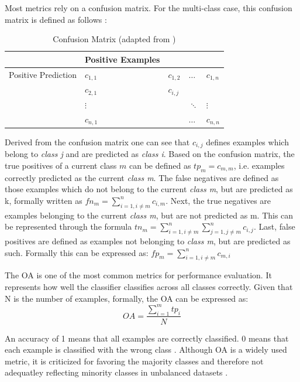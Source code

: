 \documentclass[12pt, a4paper, titlepage]{article}
\begin{document}
Most metrics rely on a confusion matrix. For the multi-class case, this confusion matrix is defined as follows \citep{Kautz2017}: 
\begin{table}[]
  \center
  \begin{tabular}{lllll}
  \hline
            & Positive Examples      &           &             &             \\ \hline
  Positive Prediction  & $c_{1,1}$ & $c_{1,2}$ & $\dots$     & $c_{1,n}$   \\
            & $c_{2,1}$ & $c_{i,j}$ &             &             \\
            &  $\vdots$         &           & $\ddots$ &   $\vdots$\\
            & $c_{n,1}$ &           & $\dots$     & $c_{n,n}$   \\ \hline
  \end{tabular}
  \caption[Confusion Matrix]{\label{tab: T1} Confusion Matrix (adapted from \citep[113]{Kautz2017})}
  \end{table}

Derived from the confusion matrix one can see that $c_{i, j}$ defines examples which belong to  \textit{class j} and are predicted as \textit{class i}. Based on the confusion matrix, the true positives of a current class $m$ can be defined as $tp_{m} = c_{m, m}$, i.e. examples correctly predicted as the current  \textit{class m}. The false negatives are defined as those examples which do not belong to the current \textit{class m}, but are predicted as k, formally written as $fn_{m} = \sum_{i=1, i \neq m}^n c_{i, m}$. Next, the true negatives are examples belonging to the current  \textit{class m}, but are not predicted as m. This can be represented through the formula $tn_{m} = \sum_{i=1, i\neq m}^n \sum_{j=1, j \neq m}^n c_{i,j}$. Last, false positives are defined as examples not belonging to  \textit{class m}, but are predicted as such. Formally this can be expressed as: $fp_{m} =  \sum_{i=1, i \neq m}^n c_{m, i}$ \citep{Kautz2017}

The \ac{OA} is one of the most common metrics for performance evaluation. It represents how well the classifier classifies across all classes correctly. Given that N is the number of examples, formally, the \ac{OA} can be expressed as: 
\[OA = \frac{\sum_{i=1}^m tp_i}{N} \]

An accuracy of 1 means that all examples are correctly classified. 0 means that each example is classified with the wrong class \citep{Berthold2020}. Although \ac{OA} is a widely used metric, it is criticized for favoring the majority classes and therefore not adequatley reflecting minority classes in unbalanced datasets \citep{Berthold2020, Fatourechi2008}.
\end{document}
